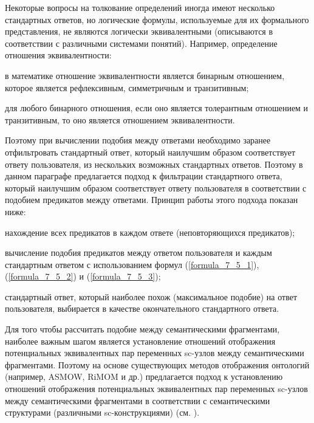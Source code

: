 Некоторые вопросы на толкование определений иногда имеют несколько стандартных ответов, но логические формулы, используемые для их формального представления, не являются логически эквивалентными (описываются в соответствии с различными системами понятий). Например, определение отношения эквивалентности:

\begin{textitemize}
	\item в математике отношение эквивалентности является бинарным отношением, которое является рефлексивным, симметричным и транзитивным;
	\item для любого бинарного отношения, если оно является толерантным отношением и транзитивным, то оно является отношением эквивалентности.
\end{textitemize}

Поэтому при вычислении подобия между ответами необходимо заранее отфильтровать стандартный ответ, который наилучшим образом соответствует ответу пользователя, из нескольких возможных стандартных ответов. Поэтому в данном параграфе предлагается подход к фильтрации стандартного ответа, который наилучшим образом соответствует ответу пользователя в соответствии с подобием предикатов между ответами. Принцип работы этого подхода показан ниже:

\begin{textitemize}
	\item нахождение всех предикатов в каждом ответе (неповторяющихся предикатов);
	\item вычисление подобия предикатов между ответом пользователя и каждым стандартным ответом с использованием формул (\ref{formula_7_5_1}), (\ref{formula_7_5_2}) и (\ref{formula_7_5_3}); 
	\item стандартный ответ, который наиболее похож (максимальное подобие) на ответ пользователя, выбирается в качестве окончательного стандартного ответа.
\end{textitemize}

Для того чтобы рассчитать подобие между семантическими фрагментами, наиболее важным шагом является установление отношений отображения потенциальных эквивалентных пар переменных sc-узлов между семантическими фрагментами. Поэтому на основе существующих методов отображения онтологий (например, ASMOW, RiMOM и др.) предлагается подход к установлению отношений отображения потенциальных эквивалентных пар переменных sc-узлов между семантическими фрагментами в соответствии с семантическими структурами (различными sc-конструкциями) (см. ).


